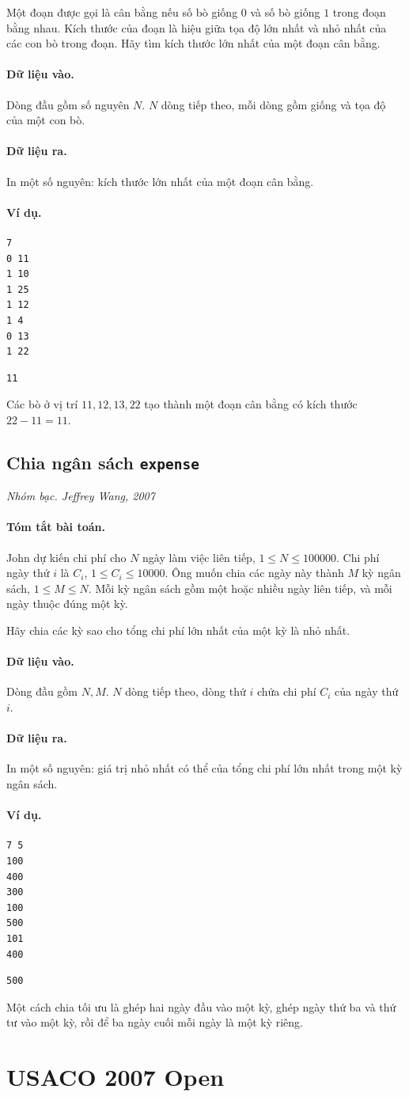 \documentclass[11pt]{article}
\newcommand{\problem}[4]{%
  \subsection[#1 (#2)]{#1 \hfill {\normalsize\texttt{#2}}}%
  \noindent\textit{#3. #4}\par\smallskip
}
\newcommand{\iosec}[1]{\paragraph{#1}}
\begin{document}
Một đoạn được gọi là cân bằng nếu số bò giống \(0\) và số bò giống \(1\) trong
đoạn bằng nhau. Kích thước của đoạn là hiệu giữa tọa độ lớn nhất và nhỏ nhất
của các con bò trong đoạn. Hãy tìm kích thước lớn nhất của một đoạn cân bằng.

\iosec{Dữ liệu vào.}
Dòng đầu gồm số nguyên \(N\). \(N\) dòng tiếp theo, mỗi dòng gồm giống và tọa
độ của một con bò.

\iosec{Dữ liệu ra.}
In một số nguyên: kích thước lớn nhất của một đoạn cân bằng.

\iosec{Ví dụ.}
\begin{verbatim}
7
0 11
1 10
1 25
1 12
1 4
0 13
1 22
\end{verbatim}

\begin{verbatim}
11
\end{verbatim}

Các bò ở vị trí \(11,12,13,22\) tạo thành một đoạn cân bằng có kích thước
\(22-11=11\).

\problem{Chia ngân sách}{expense}{Nhóm bạc}{Jeffrey Wang, 2007}

\iosec{Tóm tắt bài toán.}
John dự kiến chi phí cho \(N\) ngày làm việc liên tiếp,
\(1\le N\le 100000\). Chi phí ngày thứ \(i\) là \(C_i\),
\(1\le C_i\le 10000\). Ông muốn chia các ngày này thành \(M\) kỳ ngân sách,
\(1\le M\le N\). Mỗi kỳ ngân sách gồm một hoặc nhiều ngày liên tiếp, và mỗi
ngày thuộc đúng một kỳ.

Hãy chia các kỳ sao cho tổng chi phí lớn nhất của một kỳ là nhỏ nhất.

\iosec{Dữ liệu vào.}
Dòng đầu gồm \(N,M\). \(N\) dòng tiếp theo, dòng thứ \(i\) chứa chi phí
\(C_i\) của ngày thứ \(i\).

\iosec{Dữ liệu ra.}
In một số nguyên: giá trị nhỏ nhất có thể của tổng chi phí lớn nhất trong một
kỳ ngân sách.

\iosec{Ví dụ.}
\begin{verbatim}
7 5
100
400
300
100
500
101
400
\end{verbatim}

\begin{verbatim}
500
\end{verbatim}

Một cách chia tối ưu là ghép hai ngày đầu vào một kỳ, ghép ngày thứ ba và thứ
tư vào một kỳ, rồi để ba ngày cuối mỗi ngày là một kỳ riêng.

\section{USACO 2007 Open}
\end{document}
